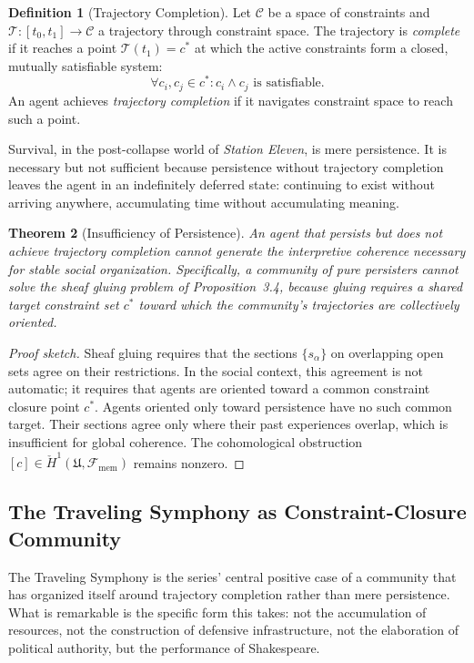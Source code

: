 \documentclass[12pt, oneside]{article}
\theoremstyle{plain}
\newtheorem{theorem}{Theorem}[section]
\theoremstyle{definition}
\newtheorem{definition}[theorem]{Definition}
\theoremstyle{remark}
\newcommand{\Traj}{\mathcal{T}}
\newcommand{\Sheaf}{\mathcal{F}}
\newcommand{\covers}{\mathfrak{U}}
\newcommand{\CC}{\mathcal{C}}
\begin{document}
\begin{definition}[Trajectory Completion]
Let $\CC$ be a space of constraints and $\Traj : [t_0, t_1] \to \CC$
a trajectory through constraint space. The trajectory is
\emph{complete} if it reaches a point $\Traj(t_1) = c^*$ at which
the active constraints form a closed, mutually satisfiable system:
\[
  \forall c_i, c_j \in c^* : c_i \wedge c_j \text{ is satisfiable}.
\]
An agent achieves \emph{trajectory completion} if it navigates
constraint space to reach such a point.
\end{definition}

Survival, in the post-collapse world of \textit{Station Eleven}, is
mere persistence. It is necessary but not sufficient because
persistence without trajectory completion leaves the agent in an
indefinitely deferred state: continuing to exist without arriving
anywhere, accumulating time without accumulating meaning.

\begin{theorem}[Insufficiency of Persistence]
\label{thm:insufficiency}
An agent that persists but does not achieve trajectory completion
cannot generate the interpretive coherence necessary for stable
social organization. Specifically, a community of pure persisters
cannot solve the sheaf gluing problem of
Proposition~3.4, because gluing requires a shared target constraint
set $c^*$ toward which the community's trajectories are collectively
oriented.
\end{theorem}

\begin{proof}[Proof sketch]
Sheaf gluing requires that the sections $\{s_\alpha\}$ on overlapping
open sets agree on their restrictions. In the social context, this
agreement is not automatic; it requires that agents are
oriented toward a common constraint closure point $c^*$. Agents
oriented only toward persistence have no such common target. Their
sections agree only where their past experiences overlap, which is
insufficient for global coherence. The cohomological obstruction
$[c] \in \check{H}^1(\covers, \Sheaf_{\mathrm{mem}})$ remains
nonzero.
\end{proof}

\subsection{The Traveling Symphony as Constraint-Closure Community}

The Traveling Symphony is the series' central positive case of a
community that has organized itself around trajectory completion
rather than mere persistence. What is remarkable is the specific
form this takes: not the accumulation of resources, not the
construction of defensive infrastructure, not the elaboration of
political authority, but the performance of Shakespeare.
\end{document}
